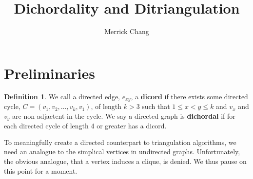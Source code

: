 \documentclass[12pt]{article}
\theoremstyle{remark}
\theoremstyle{definition}
\newtheorem{definition}{Definition}[section]
\begin{document}
 \title{Dichordality and Ditriangulation}
 \author{Merrick Chang}
 \maketitle

\section{Preliminaries}

\begin{definition} We call a directed edge, $e_{xy}$, a \textbf{dicord} if there exists some directed cycle, $C = (v_1,v_2, \dots, v_k, v_1)$, of length $k>3$ such that $1 \leq x < y \leq k$ and $v_x$ and $v_y$ are non-adjactent in the cycle. We say a directed graph is \textbf{dichordal} if for each directed cycle of length 4 or greater has a dicord.
\end{definition}

To meaningfully create a directed counterpart to triangulation algorithms, we need an analogue to the simplical vertices in undirected graphs. Unfortunately, the obvious analogue, that a vertex induces a clique, is denied. We thus pause on this point for a moment.

\end{document}
